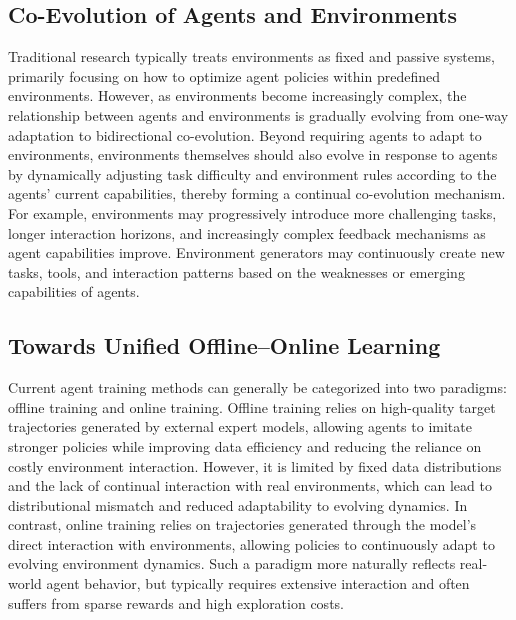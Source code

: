 \documentclass{llmxive}
\begin{document}
\subsection{Co-Evolution of Agents and Environments}

Traditional research typically treats environments as fixed and passive systems, primarily focusing on how to optimize agent policies within predefined environments.
However, as environments become increasingly complex, the relationship between agents and environments is gradually evolving from one-way adaptation to bidirectional co-evolution.
Beyond requiring agents to adapt to environments, environments themselves should also evolve in response to agents by dynamically adjusting task difficulty and environment rules according to the agents' current capabilities, thereby forming a continual co-evolution mechanism.
For example, environments may progressively introduce more challenging tasks, longer interaction horizons, and increasingly complex feedback mechanisms as agent capabilities improve.
Environment generators may continuously create new tasks, tools, and interaction patterns based on the weaknesses or emerging capabilities of agents.

\subsection{Towards Unified Offline–Online Learning}
Current agent training methods can generally be categorized into two paradigms: offline training and online training.
Offline training relies on high-quality target trajectories generated by external expert models, allowing agents to imitate stronger policies while improving data efficiency and reducing the reliance on costly environment interaction.
However, it is limited by fixed data distributions and the lack of continual interaction with real environments, which can lead to distributional mismatch and reduced adaptability to evolving dynamics.
In contrast, online training relies on trajectories generated through the model’s direct interaction with environments, allowing policies to continuously adapt to evolving environment dynamics.
Such a paradigm more naturally reflects real-world agent behavior, but typically requires extensive interaction and often suffers from sparse rewards and high exploration costs.
\end{document}
